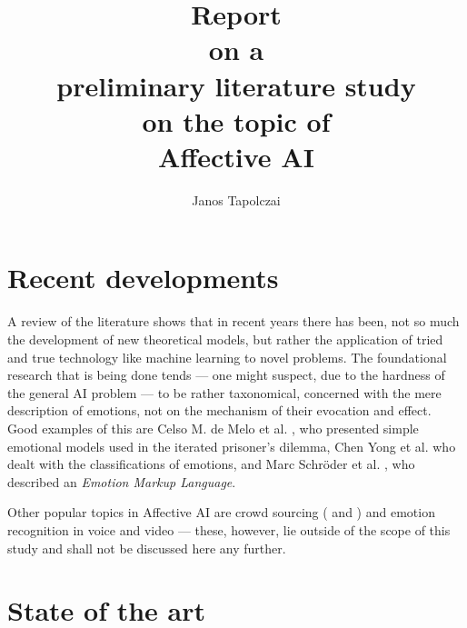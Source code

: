 \documentclass[]{scrartcl}
\title{Report\\{\large on a}\\preliminary literature study\\{\large on the topic of}\\Affective AI}
\author{Janos Tapolczai}
\renewcommand{\tt}[1]{\texttt{#1}}
\begin{document}
\maketitle

\begin{abstract}

\end{abstract}


\section{Recent developments}

A review of the literature shows that in recent years there has been, not so much the development of new theoretical models, but rather the application of tried and true technology like machine learning \cite{DBLP:conf/acii/AlZoubiHDC11} to novel problems. The foundational research that is being done tends --- one might suspect, due to the hardness of the general AI problem --- to be rather taxonomical, concerned with the mere description of emotions, not on the mechanism of their evocation and effect. Good examples of this are Celso M. de Melo et al. \cite{DBLP:conf/acii/MeloCAG11}, who presented simple emotional models used in the iterated prisoner's dilemma, Chen Yong et al. \cite{DBLP:conf/acii/YongT05} who dealt with the classifications of emotions, and Marc Schr{\"o}der et al. \cite{DBLP:conf/acii/SchroderBBPPZ11}, who described an {\em Emotion Markup Language}.

Other popular topics in Affective AI are crowd sourcing (\cite{DBLP:conf/acii/KazemzadehLGN11} and \cite{DBLP:conf/acii/RiekOR11}) and emotion recognition in voice and video --- these, however, lie outside of the scope of this study and shall not be discussed here any further.

\section{State of the art}
\end{document}
